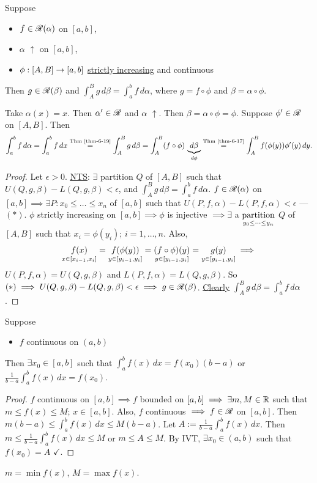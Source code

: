 \documentclass[]{article}
\begin{document}
\begin{theorem}
	\label{thm-6-19}
	Suppose
	\begin{itemize}
		\item $f\in\mathscr{R}(\alpha)$ on $[a,b]$,
		\item $\alpha$ $\uparrow$ on $[a,b]$,
		\item $\phi:[A,B]\rightarrow[a,b]$ \ul{strictly increasing} and continuous
	\end{itemize}
	Then $g\in\mathscr{R}(\beta)$ and $\int_A^B g\,d\beta=\int_a^bf\,d\alpha$, where $g = f\circ\phi$ and $\beta=\alpha\circ\phi$.
\end{theorem}
\begin{note}
	Take $\alpha(x)=x$. Then $\alpha'\in\mathscr{R}$ and $\alpha$ $\uparrow$.
	Then $\beta = \alpha\circ\phi = \phi$.
	Suppose $\phi'\in\mathscr{R}$ on $[A,B]$.
	Then $$\int_a^bf\,d\alpha = \int_a^b f\,dx \overset{\text{Thm \ref{thm-6-19}}}{=} \int_A^Bg\,d\beta = \int_A^B (f\circ\phi)\,\underbrace{d\beta}_{d\phi} \overset{\text{Thm \ref{thm-6-17}}}{=} \int_A^B f(\phi(y))\phi'(y)\,dy.$$
\end{note}
\begin{proof}
	Let $\epsilon>0$.
	\ul{\ul{NTS}}: $\exists$ partition $Q$ of $[A,B]$ such that $U(Q,g,\beta)-L(Q,g,\beta)<\epsilon$, and $\int_A^Bg\,d\beta = \int_a^bf\,d\alpha$.
	$f\in\mathscr{R}(\alpha)$ on $[a,b] \implies \exists P:x_0\leq\dots\leq x_n$ of $[a,b]$ such that $U(P,f,\alpha)-L(P,f,\alpha)<\epsilon$ --- $(*)$.
	$\phi$ strictly increasing on $[a,b] \implies \phi$ is injective $\implies \exists$ a $\underset{y_0\leq\dots\leq y_n}{\text{partition}}$ $Q$ of $[A,B]$ such that $x_i=\phi(y_i)$; $i=1,\dots,n$.
	Also, $$\underset{x\in[x_{i-1},x_i]}{f(x)} = \underset{y\in[y_{i-1},y_i]}{f(\phi(y))} = \underset{y\in[y_{i-1},y_i]}{(f\circ\phi)(y)} = \underset{y\in[y_{i-1},y_i]}{g(y)} \implies$$
	$ U(P,f,\alpha) = U(Q,g,\beta)$ and $L(P,f,\alpha) = L(Q,g,\beta)$.
	So $(*)\implies U(Q,g,\beta)-L(Q,g,\beta)<\epsilon\implies g\in\mathscr{R}(\beta)$.
	\ul{Clearly} $\int_A^Bg\,d\beta=\int_a^bf\,d\alpha$.
\end{proof}

\begin{theorem}
	Suppose
	\begin{itemize}
		\item $f$ continuous on $(a,b)$
	\end{itemize}
	Then $\exists x_0\in[a,b]$ such that $\int_a^bf(x)\,dx=f(x_0)(b-a)$ or $\frac1{b-a}\int_a^bf(x)\,dx=f(x_0)$.
\end{theorem}
\newpage
\begin{proof}
	$f$ continuous on $[a,b] \implies f$ bounded on $[a,b] \implies \exists m,M\in\mathbb{R}$ such that $m\leq f(x)\leq M$; $x\in[a,b]$.
	Also, $f$ continuous $\implies f\in\mathscr{R}$ on $[a,b]$.
	Then $m(b-a) \leq \int_a^b f(x)\,dx \leq M(b-a)$.
	Let $A:=\frac1{b-a}\int_a^bf(x)\,dx$.
	Then $m\leq\frac1{b-a}\int_a^bf(x)\,dx \leq M$ or $m\leq A\leq M$.
	By IVT, $\exists x_0\in(a,b)$ such that $f(x_0)=A$ $\checkmark$.
\end{proof}
\begin{remark}
	$m = \min f(x)$, $M = \max f(x)$.
\end{remark}
\end{document}
